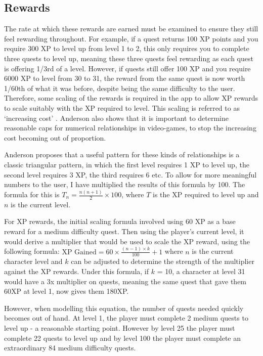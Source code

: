 \subsection{Rewards}
The rate at which these rewards are earned must be examined to ensure they still feel rewarding throughout. 
For example, if a quest returns 100 XP points and you require 300 XP to level up from level 1 to 2, this only requires you to complete three quests to level up, meaning these three quests feel rewarding as each quest is offering 1/3rd of a level.
However, if quests still offer 100 XP and you require 6000 XP to level from 30 to 31, the reward from the same quest is now worth 1/60th of what it was before, despite being the same difficulty to the user.
Therefore, some scaling of the rewards is required in the app to allow XP rewards to scale suitably with the XP required to level.
This scaling is referred to as `increasing cost' \citep{1_anderson_2016}.
Anderson also shows that it is important to determine reasonable caps for numerical relationships in video-games, to stop the increasing cost becoming out of proportion.

Anderson proposes that a useful pattern for these kinds of relationships is a classic triangular pattern, in which the first level requires 1 XP to level up, the second level requires 3 XP, the third requires 6 etc. To allow for more meaningful numbers to the user, I have multiplied the results of this formula by 100. The formula for this is $T_n= \frac{n(n+1)}{2} \times 100$, where $T$ is the XP required to level up and $n$ is the current level.

For XP rewards, the initial scaling formula involved using 60 XP as a base reward for a medium difficulty quest.
Then using the player's current level, it would derive a multiplier that would be used to scale the XP reward, using the following formula: 
$\textrm{XP Gained} = 60 \times \frac{(n - 1) \times k}{100} + 1$ where $n$ is the current character level and $k$ can be adjusted to determine the strength of the multiplier against the XP rewards.
Under this formula, if $k$ = 10, a character at level 31 would have a 3x multiplier on quests, meaning the same quest that gave them 60XP at level 1, now gives them 180XP.

However, when modelling this equation, the number of quests needed quickly becomes out of hand. 
At level 1, the player must complete 2 medium quests to level up - a reasonable starting point.
However by level 25 the player must complete 22 quests to level up and by level 100 the player must complete an extraordinary 84 medium difficulty quests.

